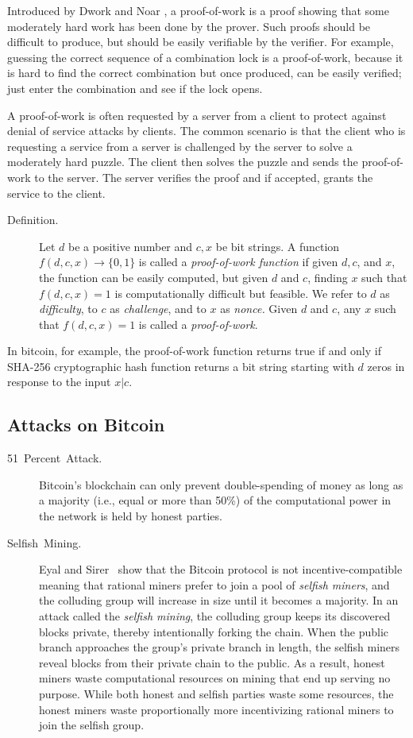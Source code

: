 \documentclass[11pt]{article}
\theoremstyle{plain}
\begin{document}
Introduced by Dwork and Noar \cite{Dwork1993}, a proof-of-work is
a proof showing that some moderately hard work has been done by the
prover. Such proofs should be difficult to produce, but should be
easily verifiable by the verifier. For example, guessing the correct
sequence of a combination lock is a proof-of-work, because it is hard
to find the correct combination but once produced, can be easily verified;
just enter the combination and see if the lock opens.

A proof-of-work is often requested by a server from a client to protect
against denial of service attacks by clients. The common scenario
is that the client who is requesting a service from a server is challenged
by the server to solve a moderately hard puzzle. The client then solves
the puzzle and sends the proof-of-work to the server. The server verifies
the proof and if accepted, grants the service to the client.
\begin{description}
	\item [{Definition.}] Let $d$ be a positive number and $c,x$ be bit strings.
	A function $f(d,c,x)\to\{0,1\}$ is called a \emph{proof-of-work function}
	if given $d,c$, and $x$, the function can be easily computed, but
	given $d$ and $c$, finding $x$ such that $f(d,c,x)=1$ is computationally
	difficult but feasible. We refer to $d$ as \emph{difficulty}, to
	$c$ as \emph{challenge}, and to $x$ as \emph{nonce.} Given $d$
	and $c$, any $x$ such that $f(d,c,x)=1$ is called a \emph{proof-of-work}.
\end{description}
In bitcoin, for example, the proof-of-work function returns true if
and only if SHA-256 cryptographic hash function returns a bit string
starting with $d$ zeros in response to the input $x|c$.

\subsection{Attacks on Bitcoin}
\begin{description}
	\item [{51~Percent~Attack.}] Bitcoin's blockchain can only prevent double-spending
	of money as long as a majority (i.e., equal or more than 50\%) of
	the computational power in the network is held by honest parties.
	\item [{Selfish~Mining.}] Eyal and Sirer~\cite{Eyal2014} show that the
	Bitcoin protocol is not incentive-compatible meaning that rational
	miners prefer to join a pool of \emph{selfish miners}, and the colluding
	group will increase in size until it becomes a majority. In an attack
	called the \emph{selfish mining}, the colluding group keeps its discovered
	blocks private, thereby intentionally forking the chain. When the
	public branch approaches the group's private branch in length, the
	selfish miners reveal blocks from their private chain to the public.
	As a result, honest miners waste computational resources on mining
	that end up serving no purpose. While both honest and selfish parties
	waste some resources, the honest miners waste proportionally more
	incentivizing rational miners to join the selfish group.
\end{description}
\end{document}
